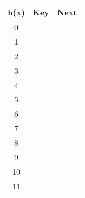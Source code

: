 \vspace{0.5cm}
\begin{tabular}{|c|c|c|}
\hline
h(x) & Key & Next \\ \hline\hline
0 & \hspace{1cm} & \hspace{1cm} \\ \hline
1 & \hspace{1cm} & \hspace{1cm} \\ \hline
2 & \hspace{1cm} & \hspace{1cm} \\ \hline
3 & \hspace{1cm} & \hspace{1cm} \\ \hline
4 & \hspace{1cm} & \hspace{1cm} \\ \hline
5 & \hspace{1cm} & \hspace{1cm} \\ \hline
6 & \hspace{1cm} & \hspace{1cm} \\ \hline
7 & \hspace{1cm} & \hspace{1cm} \\ \hline\hline
8 & \hspace{1cm} & \hspace{1cm} \\ \hline
9 & \hspace{1cm} & \hspace{1cm} \\ \hline
10 & \hspace{1cm} & \hspace{1cm} \\ \hline
11 & \hspace{1cm} & \hspace{1cm} \\ \hline
\end{tabular}
